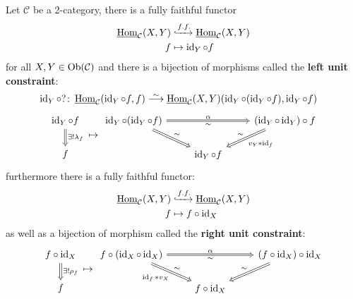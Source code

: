 \begin{construction}
\label{left_right_unit_constraints}
	Let $\mathcal{ C }$ be a 2-category, there is a fully faithful functor 	
	\begin{align*}
		\operatorname{\underline{Hom}}_{ \mathcal{ C } } ( X , Y ) 
		&\xhookrightarrow{f.f.}
		\operatorname{\underline{Hom}}_{ \mathcal{ C } } ( X , Y )
		\\ 
		f
		&\mapsto
		\operatorname{id}_Y \circ f		 
	\end{align*}
	for all $ X , Y \in \operatorname{Ob}( \mathcal{ C } )$ and there is a bijection of morphisms called the \textbf{left unit constraint}:
	\begin{align*}
		\id_Y \circ ? \colon \twoHom_{ \mathcal{ C } } ( \id_Y \circ f 	, f )
		&\isomorphism 
		\twoHom_{ \mathcal{ C } } ( X , Y )( \id_Y \circ ( \id_Y \circ f ) , \id_Y \circ f )
	\end{align*}
	\[
	\begin{tikzcd}
		\id_Y \circ f
		\ar[d, Rightarrow, " \exists ! \lambda_f"]
		\\
		f
	\end{tikzcd}
	\mapsto
	\begin{tikzcd}
		\id_Y \circ ( \id_Y \circ f )
		\ar[rr, Rightarrow, " \alpha" , " \sim"']
		\ar[rd, Rightarrow, " \sim"]
		&&
		(\id_Y \circ \id_Y ) \circ f 
		\ar[ld, Rightarrow, "v_Y * \id_f", "\sim"']
		\\
		&
		\id_Y \circ f
	\end{tikzcd}
	\]
	furthermore there is a fully faithful functor:
	\begin{align*}
		\operatorname{\underline{Hom}}_{ \mathcal{ C } } ( X , Y ) 
		&\xhookrightarrow{f.f.}
		\operatorname{\underline{Hom}}_{ \mathcal{ C }} ( X, Y )
		\\ 
		f
		&\mapsto
		f \circ \operatorname{id}_X		 
	\end{align*}
	as well as a bijection of morphism called the \textbf{right unit constraint}:
	\[
	\begin{tikzcd}
		f \circ \id_X
		\ar[d, Rightarrow, " \exists ! \rho_f"]
		\\
		f
	\end{tikzcd}
	\mapsto
	\begin{tikzcd}
		f \circ ( \id_X \circ \id_X )
		\ar[rr, Rightarrow, " \alpha" , " \sim"']
		\ar[rd, Rightarrow, "\id_f*v_X"' ," \sim"]
		&&
		( f \circ \id_X ) \circ \id_X  
		\ar[ld, Rightarrow, "\sim"']
		\\
		&
		f \circ \id_X 
	\end{tikzcd}
	\]
\end{construction}

